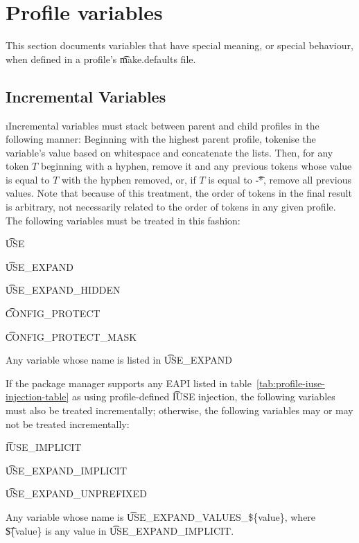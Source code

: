 \section{Profile variables}
\label{sec:profile-variables}

This section documents variables that have special meaning, or special behaviour, when defined in a
profile's \t{make.defaults} file.

\subsection{Incremental Variables}
\i{Incremental} variables must stack between parent and child profiles in the following manner:
Beginning with the highest parent profile, tokenise the variable's value based on whitespace and
concatenate the lists. Then, for any token $T$ beginning with a hyphen, remove it and any previous
tokens whose value is equal to $T$ with the hyphen removed, or, if $T$ is equal to \t{-*}, remove
all previous values. Note that because of this treatment, the order of tokens in the final result is
arbitrary, not necessarily related to the order of tokens in any given profile. The following
variables must be treated in this fashion:
\begin{compactitem}
\item \t{USE}
\item \t{USE\_EXPAND}
\item \t{USE\_EXPAND\_HIDDEN}
\item \t{CONFIG\_PROTECT}
\item \t{CONFIG\_PROTECT\_MASK}
\item Any variable whose name is listed in \t{USE\_EXPAND}
\end{compactitem}

If the package manager supports any EAPI listed in table~\ref{tab:profile-iuse-injection-table} as
using profile-defined \t{IUSE} injection, the following variables must also be treated
incrementally; otherwise, the following variables may or may not be treated incrementally:
\begin{compactitem}
\item \t{IUSE\_IMPLICIT}
\item \t{USE\_EXPAND\_IMPLICIT}
\item \t{USE\_EXPAND\_UNPREFIXED}
\item Any variable whose name is \t{USE\_EXPAND\_VALUES\_\$\{value\}}, where \t{\$\{value\}} is any
    value in \t{USE\_EXPAND\_IMPLICIT}.
\end{compactitem}

